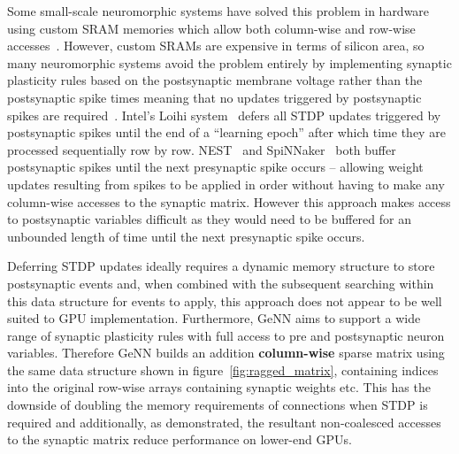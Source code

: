 \documentclass[utf8]{frontiersSCNS} %
\begin{document}
Some small-scale neuromorphic systems have solved this problem in hardware using custom SRAM memories which allow both column-wise and row-wise accesses~\citep{Seo2011}.
However, custom SRAMs are expensive in terms of silicon area, so many neuromorphic systems avoid the problem entirely by implementing synaptic plasticity rules based on the postsynaptic membrane voltage rather than the postsynaptic spike times meaning that  no updates triggered by postsynaptic spikes are required~\citep{Frenkel2018,Qiao2015}.
Intel's Loihi system~\citep{Davies2018} defers all STDP updates triggered by postsynaptic spikes until the end of a ``learning epoch'' after which time they are processed sequentially row by row.
NEST~\citep{Morrison2007} and SpiNNaker~\citep{Knight2016} both buffer postsynaptic spikes until the next presynaptic spike occurs -- allowing weight updates resulting from spikes to be applied in order without having to make any column-wise accesses to the synaptic matrix. 
However this approach makes access to postsynaptic variables difficult as they would need to be buffered for an unbounded length of time until the next presynaptic spike occurs.

Deferring STDP updates ideally requires a dynamic memory structure to store postsynaptic events and, when combined with the subsequent searching within this data structure for events to apply, this approach does not appear to be well suited to GPU implementation.
Furthermore, GeNN aims to support a wide range of synaptic plasticity rules with full access to pre and postsynaptic neuron variables.
Therefore GeNN builds an addition \textbf{column-wise} sparse matrix using the same data structure shown in figure~\ref{fig:ragged_matrix}, containing indices into the original row-wise arrays containing synaptic weights etc.
This has the downside of doubling the memory requirements of connections when STDP is required and additionally, as \citet{Yavuz2016} demonstrated, the resultant non-coalesced accesses to the synaptic matrix reduce performance on lower-end GPUs.
\end{document}
